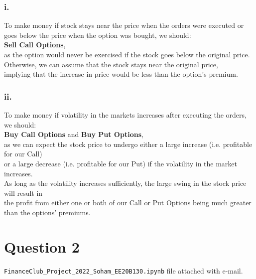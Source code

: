\documentclass{article}
\begin{document}
\subsubsection*{i.}
To make money if stock stays near the price when the orders were executed or goes below the price when the option was bought, we should: \\
\textbf{Sell Call Options}, \\
as the option would never be exercised if the stock goes below the original price. \\
Otherwise, we can assume that the stock stays near the original price, \\
implying that the increase in price would be less than the option's premium.

\subsubsection*{ii.}
To make money if volatility in the markets increases after executing the orders, we should: \\
\textbf{Buy Call Options} and \textbf{Buy Put Options}, \\
as we can expect the stock price to undergo either a large increase (i.e. profitable for our Call) \\
or a large decrease (i.e. profitable for our Put) if the volatility in the market increases. \\
As long as the volatility increases sufficiently, the large swing in the stock price will result in \\
the profit from either one or both of our Call or Put Options being much greater than the options' premiums.


\section*{Question 2}
\texttt{FinanceClub\_Project\_2022\_Soham\_EE20B130.ipynb} file attached with e-mail.
\end{document}
